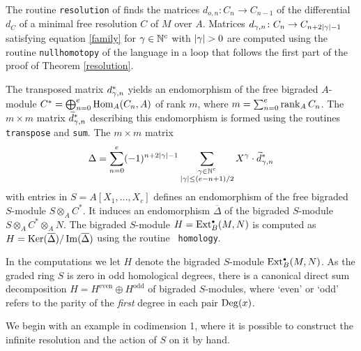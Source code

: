 \begin{Remark}
\label{algorithm}
The routine {\tt resolution} of \Mtwo finds the matrices $d_{o,n}\colon
C_n\to C_{n-1}$ of the differential $d_C$ of a minimal free resolution
$C$ of $M$ over $A$.  Matrices $d_{\gamma,n}\colon C_n\to C_{n+2|\gamma|-1}$
satisfying equation \eqref{family} for $\gamma\in{\mathbb N}^c$ with $|\g|>0$ are
computed using the routine {\tt nullhomotopy} of the \Mtwo language in
a loop that follows the first part of the proof of Theorem
\ref{resolution}.  

The transposed matrix $d^*_{\gamma,n}$ yields an endomorphism of the free
bigraded $A$-module $C^*=\bigoplus_{n=0}^e \operatorname{Hom}_A(C_n,A)$ of rank $m$,
where $m=\sum_{n=0}^e\operatorname{rank}_A C_n$.  The $m\times m$ matrix ${\widetilde
d}^*_{\gamma,n}$ describing this endomorphism is formed using the routines
{\tt transpose} and {\tt sum}.  The $m\times m$ matrix
\[
\Delta = \sum_{n=0}^e(-1)^{n+2|\gamma|-1}
\sum_{\substack{\gamma\in{\mathbb N}^c\\ |\gamma|\le(e-n+1)/2}}
X^{\gamma}\cdot\widetilde d_{\gamma,n}^*
\]
with entries in $S=A[X_1,\dots,X_c]$ defines an endomorphism of the
free bigraded $S$-module $S\otimes_A C^*$.  It induces an endomorphism
$\overline\Delta$ of the bigraded $S$-module $S\otimes_A C^*\otimes_A
N$.  The bigraded $S$-module $H=\operatorname{Ext}^{\scriptscriptstyle\bullet}_B(M,N)$ is computed as
$H=\operatorname{Ker}(\overline\Delta)/ \operatorname{Im}(\overline\Delta)$ using the routine {\tt
homology}.
 \end{Remark}

In the computations we let $H$ denote the bigraded $S$-module
$\operatorname{Ext}^{\scriptscriptstyle\bullet}_B(M,N)$.  As the graded ring $S$ is zero in odd homological
degrees, there is a canonical direct sum decomposition $H =
H^{\text{even}} \oplus H^{\text{odd}}$ of bigraded $S$-modules, where
`even' or `odd' refers to the parity of the {\it first\/} degree in
each pair $\operatorname{Deg}(x)$.

We begin with an example in codimension 1, where it is possible to
construct the infinite resolution and the action of $S$ on it by
hand.

